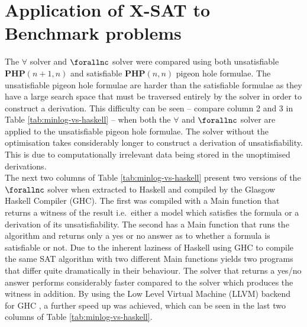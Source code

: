 \section{Application of X-SAT to Benchmark problems} \label{sec:xsatcomparison}
%
%
The $\forall$ solver and $\forallnc$ solver were compared using both unsatisfiable  $\mathbf{PHP}(n+1, n)$ and satisfiable $\mathbf{PHP}(n,n)$ pigeon hole formulae. The unsatisfiable pigeon hole formulae are harder than the satisfiable formulae as they have a large search space that must be traversed entirely by the solver in order to construct a derivation.
%
This difficulty can be seen -- compare column 2 and 3 in Table 
\ref{tab:minlog-vs-haskell} %
-- when both the $\forall$ and $\forallnc$ solver are applied to the unsatisfiable pigeon hole formulae. The solver without the optimisation takes considerably longer to construct a derivation of unsatisfiability. This is due to computationally irrelevant data being stored in the unoptimised derivations. \medskip \\ 
%
%
The next two columns of Table \ref{tab:minlog-vs-haskell} present two versions of the $\forallnc$ solver when extracted to Haskell and compiled by the Glasgow Haskell Compiler (GHC). The first was compiled with a Main function that returns a witness of the result i.e.\ either a model which satisfies the formula or a derivation of its unsatisfiability. The second has a Main function that runs the algorithm and returns only a yes or no answer as to whether a formula is satisfiable or not. Due to the inherent laziness of Haskell using GHC to compile the same SAT algorithm with two different Main functions yields two programs that differ quite dramatically in their behaviour. The solver that returns a yes/no answer performs considerably faster compared to the solver which produces the witness in addition. By using the Low Level Virtual Machine (LLVM) backend~\cite{CL04} for GHC%
, a further speed up was achieved, which can be seen in the last two columns of Table \ref{tab:minlog-vs-haskell}.

